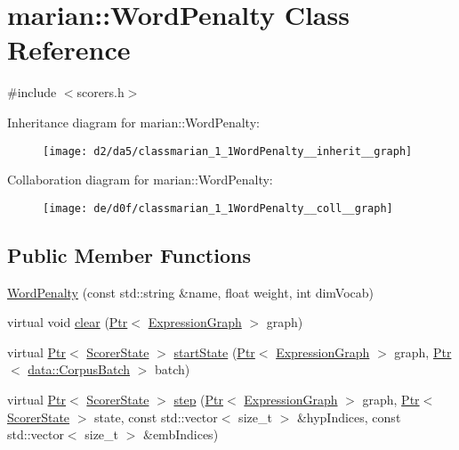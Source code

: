 \hypertarget{classmarian_1_1WordPenalty}{}\section{marian\+:\+:Word\+Penalty Class Reference}
\label{classmarian_1_1WordPenalty}


{\ttfamily \#include $<$scorers.\+h$>$}



Inheritance diagram for marian\+:\+:Word\+Penalty\+:
\nopagebreak
\begin{figure}[H]
\begin{center}
\leavevmode
\texttt{[image: d2/da5/classmarian\_1\_1WordPenalty\_\_inherit\_\_graph]}
\end{center}
\end{figure}


Collaboration diagram for marian\+:\+:Word\+Penalty\+:
\nopagebreak
\begin{figure}[H]
\begin{center}
\leavevmode
\texttt{[image: de/d0f/classmarian\_1\_1WordPenalty\_\_coll\_\_graph]}
\end{center}
\end{figure}
\subsection*{Public Member Functions}
\begin{DoxyCompactItemize}
\item 
\hyperlink{classmarian_1_1WordPenalty_ad726e60c0143a2507da845fd8b061df8}{Word\+Penalty} (const std\+::string \&name, float weight, int dim\+Vocab)
\item 
virtual void \hyperlink{classmarian_1_1WordPenalty_a96cc0adc40604d1b3be2c2f638397192}{clear} (\hyperlink{namespacemarian_ad1a373be43a00ef9ce35666145137b08}{Ptr}$<$ \hyperlink{classmarian_1_1ExpressionGraph}{Expression\+Graph} $>$ graph)
\item 
virtual \hyperlink{namespacemarian_ad1a373be43a00ef9ce35666145137b08}{Ptr}$<$ \hyperlink{classmarian_1_1ScorerState}{Scorer\+State} $>$ \hyperlink{classmarian_1_1WordPenalty_a1569dc5b0d385a1cc86d230e1aeda263}{start\+State} (\hyperlink{namespacemarian_ad1a373be43a00ef9ce35666145137b08}{Ptr}$<$ \hyperlink{classmarian_1_1ExpressionGraph}{Expression\+Graph} $>$ graph, \hyperlink{namespacemarian_ad1a373be43a00ef9ce35666145137b08}{Ptr}$<$ \hyperlink{classmarian_1_1data_1_1CorpusBatch}{data\+::\+Corpus\+Batch} $>$ batch)
\item 
virtual \hyperlink{namespacemarian_ad1a373be43a00ef9ce35666145137b08}{Ptr}$<$ \hyperlink{classmarian_1_1ScorerState}{Scorer\+State} $>$ \hyperlink{classmarian_1_1WordPenalty_accc25c25b2d7b7138fe15cefad40da23}{step} (\hyperlink{namespacemarian_ad1a373be43a00ef9ce35666145137b08}{Ptr}$<$ \hyperlink{classmarian_1_1ExpressionGraph}{Expression\+Graph} $>$ graph, \hyperlink{namespacemarian_ad1a373be43a00ef9ce35666145137b08}{Ptr}$<$ \hyperlink{classmarian_1_1ScorerState}{Scorer\+State} $>$ state, const std\+::vector$<$ size\+\_\+t $>$ \&hyp\+Indices, const std\+::vector$<$ size\+\_\+t $>$ \&emb\+Indices)
\end{DoxyCompactItemize}
